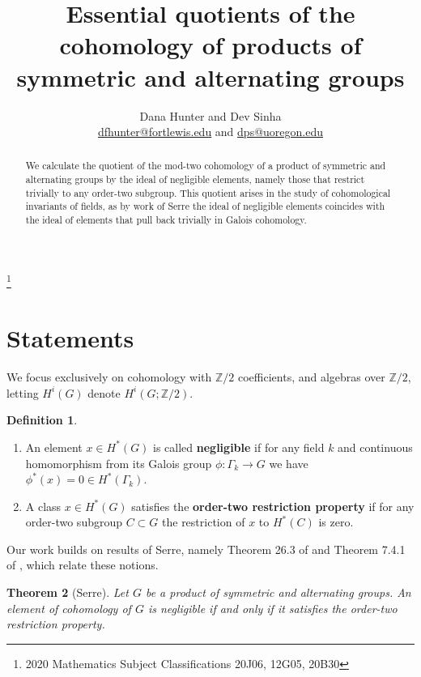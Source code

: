 \documentclass{article}
\title{Essential quotients of the cohomology of products of symmetric and alternating groups}
\author{Dana Hunter and Dev Sinha \\ \small \href{mailto:dfhunter@fortlewis.edu}{dfhunter@fortlewis.edu} and \href{mailto:dps@uoregon.edu}{dps@uoregon.edu} }
\date{}
\theoremstyle{plain}
\newtheorem{theorem}{Theorem}
\theoremstyle{definition}
\newtheorem{definition}[theorem]{Definition}
\newcommand{\Z}{\mathbb{Z}}
\begin{document}
\maketitle
{\let\thefootnote\relax\footnote{2020 Mathematics Subject Classifications 20J06, 12G05, 20B30}}

\begin{abstract}
    We calculate the quotient of the mod-two cohomology of
    a product of symmetric and alternating groups by the ideal
    of negligible elements, namely those that restrict trivially to any order-two
    subgroup. This quotient arises in the study of
    cohomological invariants of fields, as by work of Serre the ideal of negligible elements coincides with the ideal of elements that pull
    back trivially
    in Galois cohomology.
\end{abstract}


\section{Statements}

We focus exclusively on cohomology with $\Z/2$ coefficients, and algebras over $\Z/2$, letting $H^i(G)$ denote $H^i(G;\Z/2)$.

\begin{definition}\label{basicdef}
\begin{enumerate}
    \item 
An element $x \in H^*(G)$ is called {\bf negligible} if for
any field $k$ and continuous homomorphism from its Galois group $\phi: \Gamma_k \to G$ we have $\phi^*(x) = 0 \in H^*(\Gamma_k)$.

\item A class $x \in H^*(G)$ satisfies the {\bf order-two restriction property} if for any order-two subgroup $C \subset G$ the restriction of $x$ to $H^*(C)$ is zero.
\end{enumerate}

\end{definition}

Our work builds on results of Serre, namely Theorem 26.3 of \cite{Se03} and Theorem 7.4.1 of \cite{Serre26}, which relate these notions.

\begin{theorem}[Serre]\label{equiv}
    Let $G$ be a product of symmetric and alternating groups.
    An element of cohomology
of $G$ is negligible if and only if it satisfies the order-two
restriction property.  
\end{theorem}
\end{document}

